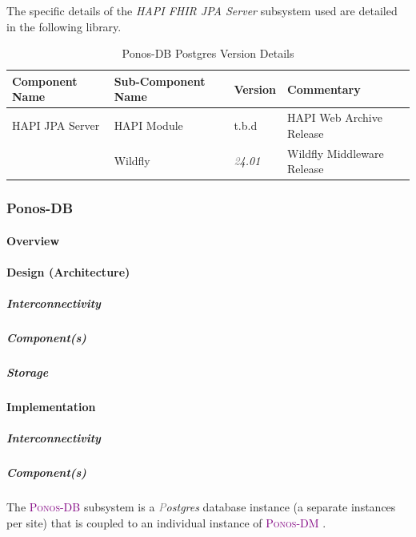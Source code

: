 \documentclass[a4paper]{book}
\newcommand{\ponosdm}{\textsc{\textcolor{Purple}{\small{Ponos-DM }}}}
\newcommand{\ponosdb}{\textsc{\textcolor{Purple}{\small{Ponos-DB }}}}
\newcommand{\postgres}{\textit{\textcolor{gray}Postgres }}
\newcommand{\wildflyversion}{\textit{\textcolor{gray}24.01 }}
\begin{document}
The specific details of the \textit{HAPI FHIR JPA Server} subsystem used are detailed in the following library.
\begin{table}[h!]
    \begin{center}
    \small{
    \begin{tabular}{ || l | l  | l | l || }
        \hline
        \textbf{Component Name} & \textbf{Sub-Component Name} & \textbf{Version} & \textbf{Commentary} \\
        \hline
        HAPI JPA Server & HAPI Module &  t.b.d & HAPI Web Archive Release \\
        \hline
         & Wildfly & \wildflyversion & Wildfly Middleware Release\\
        \hline
    \end{tabular}
    }
    \caption{Ponos-DB Postgres Version Details}
    \end{center}
\end{table}

\subsubsection{Ponos-DB}

\paragraph{Overview}

\paragraph{Design (Architecture)}

\subparagraph{Interconnectivity}

\subparagraph{Component(s)}

\subparagraph{Storage}

\paragraph{Implementation}

\subparagraph{Interconnectivity}

\subparagraph{Component(s)}

The \ponosdb subsystem is a \postgres database instance (a separate instances per site) that is coupled to an individual instance of \ponosdm.
\end{document}
